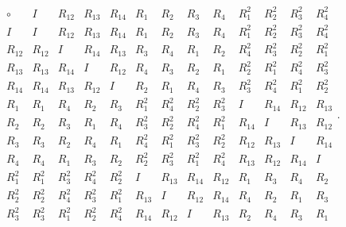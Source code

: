 \documentclass[11pt,a4paper]{article}
\begin{document}
\[
\begin{array}{c|c|c|c|c|c|c|c|c|c|c|c|c}
\circ &I &R_{12} &R_{13} &R_{14} &R_1 &R_2 &R_3 &R_4 &R_1^2 &R_2^2 &R_3^2 &R_4^2 \\ \hline
 I & I & R_{12} & R_{13} & R_{14} & R_1 & R_2 & R_3 & R_4 & R_1^2 & R_2^2 & R_3^2 & R_4^2 \\\hline
 R_{12} & R_{12} & I & R_{14} & R_{13} & R_3 & R_4 & R_1 & R_2 & R_4^2 & R_3^2 & R_2^2 & R_1^2\\\hline
 R_{13} & R_{13} & R_{14} & I & R_{12} & R_4 & R_3 & R_2 & R_1 & R_2^2 & R_1^2 & R_4^2 & R_3^2 \\\hline
 R_{14} & R_{14} & R_{13} & R_{12} & I & R_2 & R_1 & R_4 & R_3 & R_3^2 & R_4^2 & R_1^2 & R_2^2 \\\hline
 R_1 & R_1 & R_4 & R_2 & R_3 & R_1^2 & R_4^2 & R_2^2 & R_3^2 & I & R_{14} & R_{12} & R_{13} \\\hline
 R_2 & R_2 & R_3 & R_1 & R_4 & R_3^2 & R_2^2 & R_4^2 & R_1^2 & R_{14} & I & R_{13} & R_{12} \\\hline
 R_3 & R_3 & R_2 & R_4 & R_1 & R_4^2 & R_1^2 & R_3^2 & R_2^2 & R_{12} & R_{13} & I & R_{14} \\\hline
 R_4 & R_4 & R_1 & R_3 & R_2 & R_2^2 & R_3^2 & R_1^2 & R_4^2 & R_{13} & R_{12} & R_{14} & I \\\hline
 R_1^2 & R_1^2 & R_3^2 & R_4^2 & R_2^2 & I & R_{13} & R_{14} & R_{12} & R_1 & R_3 & R_4 & R_2 \\\hline
 R_2^2 & R_2^2 & R_4^2 & R_3^2 & R_1^2 & R_{13} & I & R_{12} & R_{14} & R_4 & R_2 & R_1 & R_3 \\\hline
 R_3^2 & R_3^2 & R_1^2 & R_2^2 & R_4^2 & R_{14} & R_{12} & I & R_{13} & R_2 & R_4 & R_3 & R_1 \\
\end{array}
.\]
\end{document}
